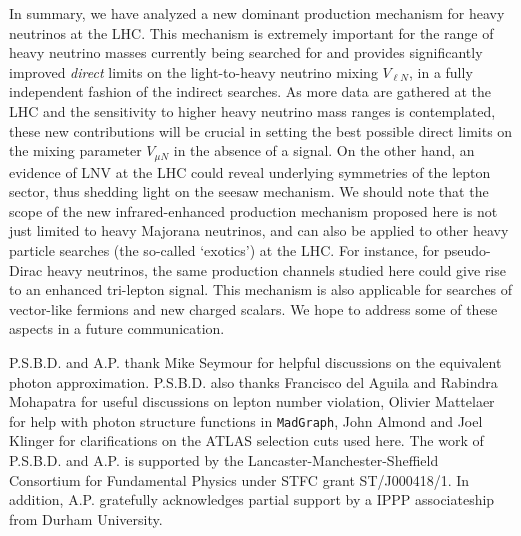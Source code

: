 \documentclass[reprint,prl,twocolumn,superscriptaddress,showpacs,nofootinbib,floatfix,preprintnumbers]{revtex4-1}
\begin{document}
In summary, we  have analyzed a new dominant  production mechanism for
heavy neutrinos at the LHC.  This mechanism is extremely important for
the range of  heavy neutrino masses currently being searched
for  and provides significantly  improved {\em  direct} limits  on the
light-to-heavy neutrino  mixing $V_{\ell  N}$, in a  fully independent
fashion of the indirect searches. As more data are gathered at the LHC
and  the   sensitivity  to  higher  heavy  neutrino   mass  ranges  is
contemplated, these  new contributions will be crucial in
setting  the  best possible  direct  limits  on  the mixing  parameter
$V_{\mu  N}$ in the absence of a signal. On the other hand, 
an evidence of LNV at the LHC could   
reveal underlying symmetries of the lepton sector, thus  
shedding light on the  seesaw mechanism. 
We should note that the scope of the new infrared-enhanced 
production mechanism
proposed here is not just limited to heavy Majorana neutrinos, and can
also  be  applied to  other  heavy  particle  searches (the  so-called
`exotics')  at  the  LHC. For instance, for pseudo-Dirac heavy neutrinos, 
 the same production channels studied 
here could give rise to an enhanced tri-lepton signal. 
This mechanism is also applicable for searches of 
vector-like fermions and new charged  scalars. 
We hope to  address some of these
aspects in a future communication.

\acknowledgments 
P.S.B.D. and A.P. thank Mike Seymour for helpful discussions on the
equivalent photon approximation. P.S.B.D. also thanks Francisco del Aguila 
and Rabindra Mohapatra for useful discussions on lepton number violation, 
Olivier Mattelaer for
help with photon structure functions in {\tt MadGraph}, 
John Almond and Joel Klinger for
clarifications on the ATLAS selection cuts used here. The work of
P.S.B.D. and A.P. is supported by the Lancaster-Manchester-Sheffield
Consortium for Fundamental Physics under STFC grant ST/J000418/1. In
addition, A.P.  gratefully acknowledges partial support by a IPPP
associateship from Durham University.
\end{document}
